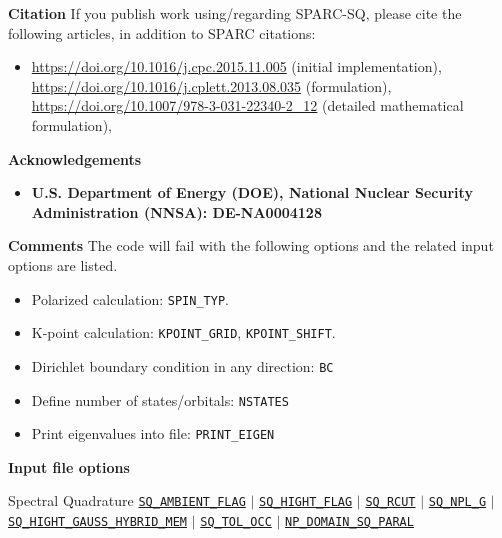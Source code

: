 \begin{frame}[allowframebreaks]{\textbf{Citation}} \label{Citation}
If you publish work using/regarding SPARC-SQ, please cite the following articles, in addition to SPARC citations:
\begin{itemize}
    \item \url{https://doi.org/10.1016/j.cpc.2015.11.005} (initial implementation),
     \url{https://doi.org/10.1016/j.cplett.2013.08.035} (formulation),
    \url{https://doi.org/10.1007/978-3-031-22340-2_12} (detailed mathematical formulation),

\end{itemize}
\end{frame}

\begin{frame}[allowframebreaks]{\textbf{Acknowledgements}} \label{Acknowledgements}
\begin{itemize}
    \item \textbf{U.S. Department of Energy (DOE), National Nuclear Security Administration (NNSA): DE-NA0004128 
        } \\
\end{itemize}
\end{frame}

\begin{frame}[allowframebreaks]{\textbf{Comments}} \label{Introduction}
The code will fail with the following options and the related input options are listed.
\begin{itemize}
  \item Polarized calculation: \texttt{SPIN\_TYP}.
  \item K-point calculation: \texttt{KPOINT\_GRID}, \texttt{KPOINT\_SHIFT}.
  \item Dirichlet boundary condition in any direction: \texttt{BC}
  \item Define number of states/orbitals: \texttt{NSTATES}
  \item Print eigenvalues into file: \texttt{PRINT\_EIGEN}
\end{itemize}

\end{frame}

\begin{frame}[allowframebreaks]{\textbf{Input file options}} \label{Index}
\vspace{-2mm}
 \begin{block}{Spectral Quadrature}
\hyperlink{SQ_AMBIENT_FLAG}{\texttt{SQ\_AMBIENT\_FLAG}} $\vert$ 
\hyperlink{SQ_HIGHT_FLAG}{\texttt{SQ\_HIGHT\_FLAG}} $\vert$ 
\hyperlink{SQ_RCUT}{\texttt{SQ\_RCUT}} $\vert$ 
\hyperlink{SQ_NPL_G}{\texttt{SQ\_NPL\_G}}  $\vert$ 
\hyperlink{SQ_HIGHT_GAUSS_HYBRID_MEM}{\texttt{SQ\_HIGHT\_GAUSS\_HYBRID\_MEM}} $\vert$ 
\hyperlink{SQ_TOL_OCC}{\texttt{SQ\_TOL\_OCC}} $\vert$ 
\hyperlink{NP_DOMAIN_SQ_PARAL}{\texttt{NP\_DOMAIN\_SQ\_PARAL}} 
\end{block}

\end{frame}
